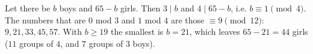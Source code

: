 Let there be $b$ boys and $65-b$ girls. Then $3\mid b$ and $4\mid65-b$, i.e. $b\equiv1\pmod4$. The numbers that are $0$ mod $3$ and $1$ mod $4$ are those $\equiv9\pmod{12}$: $9,21,33,45,57$. With $b\ge19$ the smallest is $b=21$, which leaves $65-21=\boxed{44}$ girls ($11$ groups of $4$, and $7$ groups of $3$ boys).
